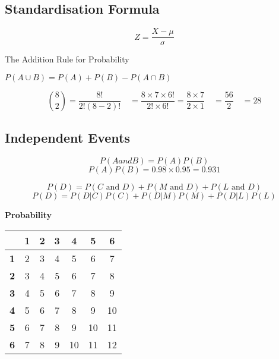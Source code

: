 \documentclass[]{report}
\begin{document}
\subsection{Standardisation Formula}

\begin{equation}
Z = \frac{ X - \mu } {  \sigma }
\end{equation}







The Addition Rule for Probability

$P(A \cup B ) = P(A) + P(B) - P(A \cap B)$

\[{8 \choose 2} =\frac{8!}{2!(8-2)!} \quad = \frac{8\times7\times6!}{2!\times 6!} = \frac{8\times7}{2\times 1} \quad = \frac{56}{2} \quad = 28\]




\subsection{Independent Events}


\[P(A and B) = P(A)P(B)\]
\[P(A)P(B) = 0.98\times0.95 = 0.931\]


\[	P(D) = P(C \mbox{ and } D) + P(M \mbox{ and } D) + P(L \mbox{ and } D)\]
\[	P(D) = P(D|C)P(C) + P(D|M)P(M) + P(D|L)P(L)\]











\noindent \textbf{Probability}


\begin{center}
	\begin{tabular}{|c||c|c|c|c|c|c|}
		\hline
		\phantom{space}	& \phantom{sp} \textbf{1}\phantom{sp}	&\phantom{sp} \textbf{2}\phantom{sp}&\phantom{sp} \textbf{3}\phantom{sp}	&\phantom{sp} \textbf{4}	\phantom{sp}&\phantom{sp} \textbf{5} \phantom{sp}&\phantom{sp}\textbf{6}	\phantom{sp}\\ \hline	\hline
		\textbf{1}	&	2	&	3	&	4	&	5	&	6	&	7	 \\ \hline	
		\textbf{2}	&	3	&	4	&	5	&	6	&	7	&	8	 \\ \hline	
		\textbf{3}	&	4	&	5	&	6	&	7	&	8	&	9	 \\ \hline	
		\textbf{4}	&	5	&	6	&	7	&	8	&	9	&	10	 \\ \hline	
		\textbf{5}	&	6	&	7	&	8	&	9	&	10	&	11	 \\ \hline	
		\textbf{6}	&	7	&	8	&	9	&	10	&	11	&	12	 \\ \hline	
	\end{tabular}
\end{center}
\end{document}
